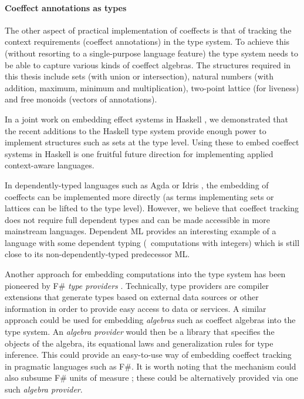 
\paragraph{Coeffect annotations as types}

The other aspect of practical implementation of coeffects is that of tracking the context requirements
(coeffect annotations) in the type system. To achieve this (without resorting to a single-purpose
language feature) the type system needs to be able to capture various kinds of coeffect algebras.
The structures required in this thesis include sets (with union or intersection), natural numbers (with
addition, maximum, minimum and multiplication), two-point lattice (for liveness) and free monoids
(vectors of annotations).

In a joint work on embedding effect systems in Haskell \cite{effects-embedding}, we demonstrated that
the recent additions to the Haskell type system provide enough power to implement structures such
as sets at the type level. Using these to embed coeffect systems in Haskell is one fruitful
future direction for implementing applied context-aware languages.

In dependently-typed languages such as Agda or Idris \cite{other-agda,other-idris},
the embedding of coeffects can be implemented more directly (as terms implementing sets or lattices
can be lifted to the type level). However, we believe that coeffect tracking does not require full
dependent types and can be made accessible in more mainstream languages. Dependent ML
\cite{types-dependent-ml} provides an interesting example of a language with some dependent typing
(\eg~computations with integers) which is still close to its non-dependently-typed predecessor ML.

Another approach for embedding computations into the type system has been pioneered by F\#
\emph{type providers} \cite{app-inforich}. Technically, type providers are compiler extensions
that generate types based on external data sources or other information in order to provide easy
access to data or services. A similar approach could be used for embedding \emph{algebras} such
as coeffect algebras into the type system. An \emph{algebra provider} would then be a library that
specifies the objects of the algebra, its equational laws and generalization rules for type inference.
This could provide an easy-to-use way of embedding coeffect tracking in pragmatic languages
such as F\#. It is worth noting that the mechanism could also subsume F\# units of measure
\cite{types-units-of-measure}; these could be alternatively provided via one such \emph{algebra
provider}.


